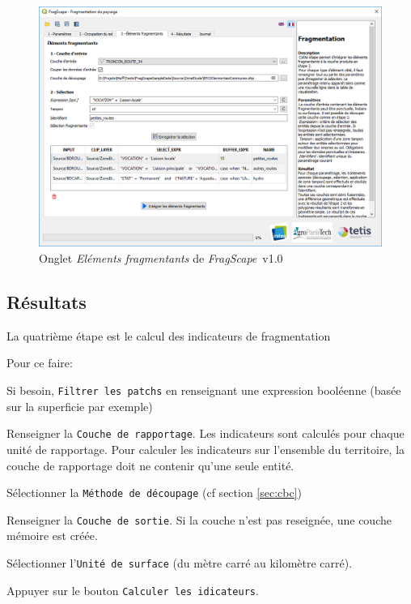 \documentclass[11pt]{article}
\newcommand{\source}[1]{\vspace*{-0.4cm}\caption*{\textit{Source: {#1}}}}
\newcommand{\tool}{\emph{FragScape}}
\let\tempone\itemize
\let\temptwo\enditemize
\renewenvironment{itemize}{\tempone\addtolength{\itemsep}{-0.5\baselineskip}}{\temptwo}
\begin{document}
\begin{figure}[h!]
    \centering
    \includegraphics[scale=0.6]{pictures/fragmTabFr.png}
    \caption{Onglet \textit{Eléments fragmentants} de \tool\ v1.0}
    \label{fig:fragmTab}
\end{figure}

\subsection{Résultats}

La quatrième étape est le calcul des indicateurs de fragmentation

Pour ce faire:
\begin{itemize}
    \item Si besoin, \texttt{Filtrer les patchs} en renseignant une expression booléenne (basée sur la superficie par exemple)
    \item Renseigner la \texttt{Couche de rapportage}. Les indicateurs sont calculés pour chaque unité de rapportage. Pour calculer les indicateurs sur l'ensemble du territoire, la couche de rapportage doit ne contenir qu'une seule entité.
    \item Sélectionner la \texttt{Méthode de découpage} (cf section \ref{sec:cbc})
    \item Renseigner la \texttt{Couche de sortie}. Si la couche n'est pas reseignée, une couche mémoire est créée.
    \item Sélectionner l'\texttt{Unité de surface} (du mètre carré au kilomètre carré).
    \item Appuyer sur le bouton \texttt{Calculer les idicateurs}.
\end{itemize}
\end{document}
